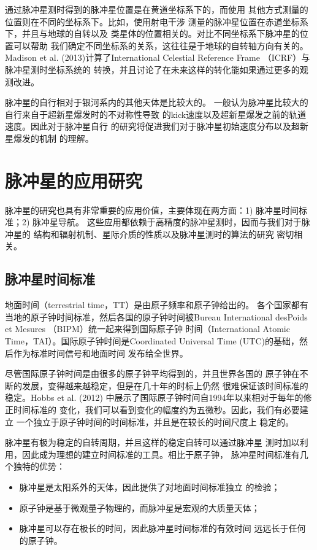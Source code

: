 通过脉冲星测时得到的脉冲星位置是在黄道坐标系下的，而使用
其他方式测量的位置则在不同的坐标系下。比如，使用射电干涉
测量的脉冲星位置在赤道坐标系下，并且与地球的自转以及
类星体的位置相关的。对比不同坐标系下脉冲星的位置可以帮助
我们确定不同坐标系的关系，这往往是于地球的自转轴方向有关的。
Madison et al. (2013)\supercite{Madison13}计算了International 
Celestial Reference Frame （ICRF）与脉冲星测时坐标系统的
转换，并且讨论了在未来这样的转化能如果通过更多的观测改进。

脉冲星的自行相对于银河系内的其他天体是比较大的\supercite{hobbs}。
一般认为脉冲星比较大的自行来自于超新星爆发时的不对称性导致
的kick速度以及超新星爆发之前的轨道速度。因此对于脉冲星自行
的研究将促进我们对于脉冲星初始速度分布以及超新星爆发的机制
的理解。

\section{脉冲星的应用研究}

脉冲星的研究也具有非常重要的应用价值，主要体现在两方面：1) 
脉冲星时间标准\supercite{hcm+12}；2) 脉冲星导航\supercite{dhy+13}。
这些应用都依赖于高精度的脉冲星测时，因而与我们对于脉冲星的
结构和辐射机制、星际介质的性质以及脉冲星测时的算法的研究
密切相关。

\subsection{脉冲星时间标准}

地面时间（terrestrial time，TT）是由原子频率和原子钟给出的。
各个国家都有当地的原子钟时间标准，然后各国的原子钟时间被Bureau 
International desPoids et Mesures （BIPM）统一起来得到国际原子钟
时间（International Atomic Time，TAI）。国际原子钟时间是Coordinated 
Universal Time (UTC)的基础，然后作为标准时间信号和地面时间
发布给全世界。

尽管国际原子钟时间是由很多的原子钟平均得到的，并且世界各国的
原子钟在不断的发展，变得越来越稳定，但是在几十年的时标上仍然
很难保证该时间标准的稳定。Hobbs et al. (2012)\supercite{hcm+12}
中展示了国际原子钟时间自1994年以来相对于每年的修正时间标准的
变化，我们可以看到变化的幅度约为五微秒。因此，我们有必要建立
一个独立于原子钟时间的时间标准，并且是在较长的时间尺度上
稳定的。

脉冲星有极为稳定的自转周期，并且这样的稳定自转可以通过脉冲星
测时加以利用，因此成为理想的建立时间标准的工具。相比于原子钟，
脉冲星时间标准有几个独特的优势：
\begin{itemize}
\item 脉冲星是太阳系外的天体，因此提供了对地面时间标准独立
的检验；
\item 原子钟是基于微观量子物理的，而脉冲星是宏观的大质量天体；
\item 脉冲星可以存在极长的时间，因此脉冲星时间标准的有效时间
远远长于任何的原子钟。
\end{itemize}

